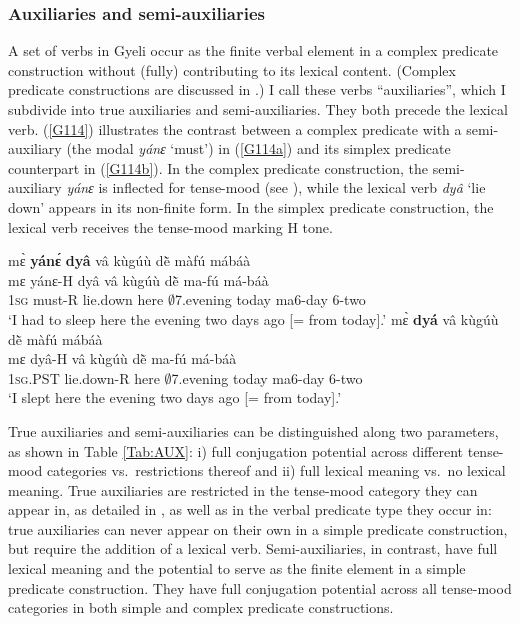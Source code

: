 \subsubsection{Auxiliaries and semi-auxiliaries}
\label{sec:AUX}

A set of verbs in Gyeli occur as the finite verbal element in a complex predicate construction without (fully) contributing to its lexical content. (Complex predicate constructions are discussed in .) I call these verbs ``auxiliaries'', which I subdivide into true auxiliaries and semi-auxiliaries.  They both precede the lexical verb. (\ref{G114}) illustrates the contrast between a complex predicate with a semi-auxiliary (the modal {\itshape yánɛ} `must') in (\ref{G114a}) and its simplex predicate counterpart in (\ref{G114b}). In the complex predicate construction, the semi-auxiliary {\itshape yánɛ} is inflected for tense-mood (see ), while the lexical verb {\itshape dyâ} `lie down' appears in its non-finite form. In the simplex predicate construction, the lexical verb receives the tense-mood marking H tone.

\begin{exe} 
\ex\label{G114} 
\begin{xlist}
\ex\label{G114a} 
  \glll  mɛ̀ {\bfseries yánɛ́} {\bfseries dyâ} vâ kùgúù dẽ̀ màfú mábáà \\
     mɛ yánɛ-H dyâ vâ kùgúù dẽ̀ ma-fú má-báà \\
          1\textsc{sg} must-R lie.down here $\emptyset$7.evening today ma6-day 6-two  \\
    \trans `I had to sleep here the evening two days ago [= from today].'
\ex\label{G114b} 
  \glll  mɛ̀ {\bfseries dyá} vâ kùgúù dẽ̀ màfú mábáà \\
     mɛ  dyâ-H vâ kùgúù dẽ̀ ma-fú má-báà \\
          1\textsc{sg}.PST lie.down-R here $\emptyset$7.evening today ma6-day 6-two  \\
    \trans `I slept here the evening two days ago [= from today].'
\end{xlist}
\end{exe}

True auxiliaries and semi-auxiliaries can be distinguished along two parameters, as shown in Table \ref{Tab:AUX}: i) full conjugation potential across different tense-mood categories vs.\ restrictions thereof and ii) full lexical meaning vs.\ no lexical meaning. True auxiliaries are restricted in the tense-mood category they can appear in, as detailed in , as well as in the verbal predicate type they occur in: true auxiliaries can never appear on their own in a simple predicate construction, but require the addition of a lexical verb. Semi-auxiliaries, in contrast, have full lexical meaning and the potential to serve as the finite element in a simple predicate construction. They have full conjugation potential across all tense-mood categories in both simple and complex predicate constructions. 


